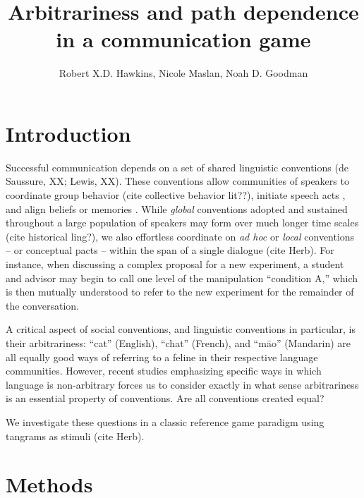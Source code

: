 \documentclass[12pt, floatsintext, jou]{apa6}
\title{Arbitrariness and path dependence in a communication game}
\author{Robert X.D. Hawkins, Nicole Maslan, Noah D. Goodman}
\affiliation{Stanford University}
\begin{document}
\maketitle
\section{Introduction}

Successful communication depends on a set of shared linguistic conventions (de Saussure, XX; Lewis, XX). These conventions allow communities of speakers to coordinate group behavior (cite collective behavior lit??), initiate speech acts \cite{Strawson64_IntentionConvention}, and align beliefs or memories \cite{StolkVerhagenToni16_ConceptualAlignment, ComanEtAl16_MnemonicConvergence}. 
While \emph{global} conventions adopted and sustained throughout a large population of speakers may form over much longer time scales (cite historical ling?), we also effortless coordinate on \emph{ad hoc} or \emph{local} conventions -- or conceptual pacts -- within the span of a single dialogue (cite Herb). For instance, when discussing a complex proposal for a new experiment, a student and advisor may begin to call one level of the manipulation ``condition A,'' which is then mutually understood to refer to the new experiment for the remainder of the conversation. 

A critical aspect of social conventions, and linguistic conventions in particular, is their arbitrariness: ``cat'' (English), ``chat'' (French), and ``m\={a}o'' (Mandarin) are all equally good ways of referring to a feline in their respective language communities. However, recent studies  emphasizing specific ways in which language is non-arbitrary \cite{MonaghanEtAl14_ArbitraryLanguage, DingemanseEtAl15_IconicityLanguage, LewisFrank16_LengthOfWordsComplexity} forces us to consider exactly in what sense arbitrariness is an essential property of conventions. Are all conventions created equal?

We investigate these questions in a classic reference game paradigm using tangrams as stimuli (cite Herb).



\section{Methods}
\end{document}
